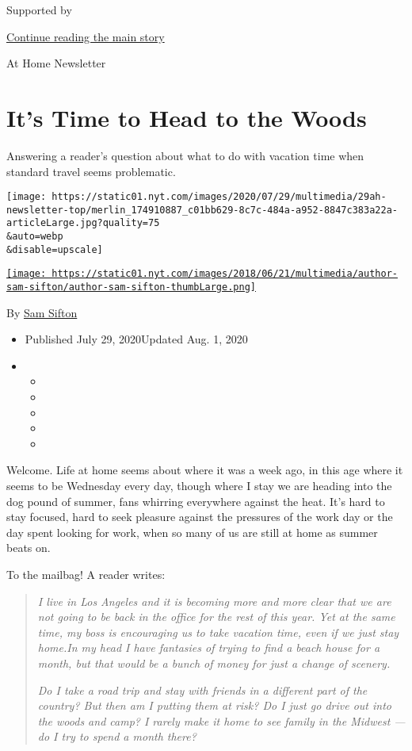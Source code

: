 Supported by

\protect\hyperlink{after-sponsor}{Continue reading the main story}

At Home Newsletter

\hypertarget{its-time-to-head-to-the-woods}{%
\section{It's Time to Head to the
Woods}\label{its-time-to-head-to-the-woods}}

Answering a reader's question about what to do with vacation time when
standard travel seems problematic.

\texttt{[image: https://static01.nyt.com/images/2020/07/29/multimedia/29ah-newsletter-top/merlin\_174910887\_c01bb629-8c7c-484a-a952-8847c383a22a-articleLarge.jpg?quality=75\\\&auto=webp\\\&disable=upscale]}

\href{https://www.nytimes.com/by/sam-sifton}{\texttt{[image: https://static01.nyt.com/images/2018/06/21/multimedia/author-sam-sifton/author-sam-sifton-thumbLarge.png]}}

By \href{https://www.nytimes.com/by/sam-sifton}{Sam Sifton}

\begin{itemize}
\item
  Published July 29, 2020Updated Aug. 1, 2020
\item
  \begin{itemize}
  \item
  \item
  \item
  \item
  \item
  \end{itemize}
\end{itemize}

Welcome. Life at home seems about where it was a week ago, in this age
where it seems to be Wednesday every day, though where I stay we are
heading into the dog pound of summer, fans whirring everywhere against
the heat. It's hard to stay focused, hard to seek pleasure against the
pressures of the work day or the day spent looking for work, when so
many of us are still at home as summer beats on.

To the mailbag! A reader writes:

\begin{quote}
\emph{I live in Los Angeles and it is becoming more and more clear that
we are not going to be back in the office for the rest of this year. Yet
at the same time, my boss is encouraging us to take vacation time, even
if we just stay home.In my head I have fantasies of trying to find a
beach house for a month, but that would be a bunch of money for just a
change of scenery.}

\emph{Do I take a road trip and stay with friends in a different part of
the country? But then am I putting them at risk? Do I just go drive out
into the woods and camp? I rarely make it home to see family in the
Midwest --- do I try to spend a month there?}
\end{quote}

